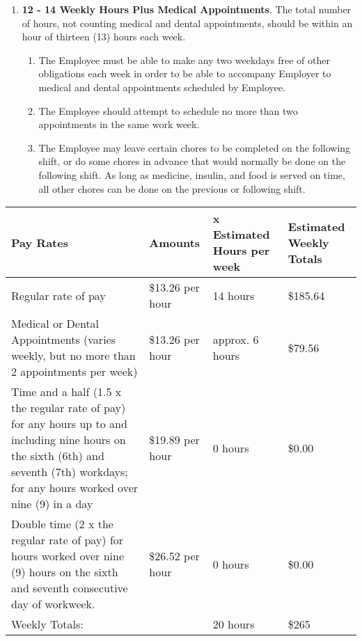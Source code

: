 \documentclass[]{article}
\begin{document}
\begin{enumerate}
\begin{enumerate}
			\item \textbf{12 - 14 Weekly Hours Plus Medical Appointments}. The total number of hours, not counting medical and dental appointments, should be within an hour of thirteen (13) hours each week. 
				\begin{enumerate}
					\item The Employee must be able to make any two weekdays free of other obligations each week in order to be able to accompany Employer to medical and dental appointments scheduled by Employee.
					\item The Employee should attempt to schedule no more than two appointments in the same work week.
					\item The Employee may leave certain chores to be completed on the following shift, or do some chores in advance that would normally be done on the following shift. As long as medicine, insulin, and food is served on time, all other chores can be done on the previous or following shift.
				\end{enumerate}
		\end{enumerate}
		\begin{tabular}{|p{}|l|l|p{}|}
			\hline
			Pay Rates & Amounts & x Estimated Hours per week & Estimated Weekly Totals\\ \hline
			Regular rate of pay & \$13.26 per hour & 14 hours & \$185.64\\ \hline
			Medical or Dental Appointments (varies weekly, but no more than 2 appointments per week) & \$13.26 per hour & approx. 6 hours & \$79.56\\ \hline
			Time and a half (1.5 x the regular rate of pay) for any hours up to and including nine hours on the sixth (6th) and seventh (7th) workdays; for any hours worked over nine (9) in a day & \$19.89 per hour & 0 hours & \$0.00\\ \hline
			Double time (2 x the regular rate of pay) for hours worked over nine (9) hours on the sixth and seventh consecutive day of workweek. & \$26.52 per hour & 0 hours & \$0.00\\ \hline
			Weekly Totals: & & 20 hours & \$265\\
			\hline
		\end{tabular}
\end{enumerate}
\end{document}
